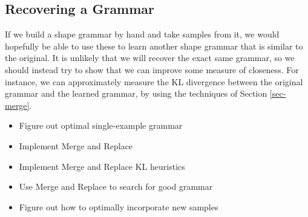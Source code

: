 \subsection{Recovering a Grammar}

If we build a shape grammar by hand and take samples from it, we would
hopefully be able to use these to learn another shape grammar that is
similar to the original. It is unlikely that we will recover the exact
same grammar, so we should instead try to show that we can improve
some measure of closeness. For instance, we can approximately measure
the KL divergence between the original grammar and the learned
grammar, by using the techniques of Section \ref{sec-merge}.

\begin{itemize}
\item Figure out optimal single-example grammar
\item Implement Merge and Replace
\item Implement Merge and Replace KL heuristics
\item Use Merge and Replace to search for good grammar
\item Figure out how to optimally incorporate new samples

\end{itemize}

